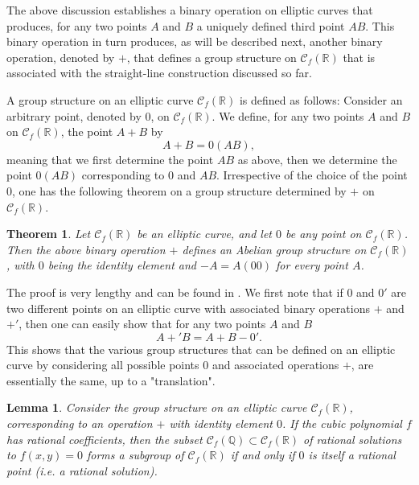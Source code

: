 \documentclass[12pt,letterpaper]{book}
\newtheorem{theorem}{Theorem}
\newtheorem{lemma}{Lemma}
\begin{document}
The above discussion establishes a binary operation on elliptic
curves that produces, for any two points $A$ and $B$ a uniquely
defined third point $AB$. This binary operation in turn produces, as
will be described next, another binary operation, denoted by $+$,
that defines a group structure on $\mathscr{C}_f(\mathbb{R})$ that
is associated with the straight-line construction discussed so far.

A group structure on an elliptic curve $\mathscr{C}_f(\mathbb{R})$ is defined as follows: Consider an arbitrary point,
denoted by $0$, on $\mathscr{C}_f(\mathbb{R})$. We define, for any two points $A$ and $B$ on $\mathscr{C}_f(\mathbb{R})$,
the point $A+B$ by
\begin{equation}
A+B=0(AB),
\end{equation}
meaning that we first determine the point $AB$ as above, then we determine the point $0(AB)$ corresponding to $0$ and $AB$. Irrespective of the choice of the
point $0$, one has the following theorem on a group structure determined by $+$ on $\mathscr{C}_f(\mathbb{R})$.

\begin{theorem}
Let $\mathscr{C}_f(\mathbb{R})$ be an elliptic curve, and let $0$ be any point on $\mathscr{C}_f(\mathbb{R})$.
Then the above binary operation $+$ defines an Abelian group structure on $\mathscr{C}_f(\mathbb{R})$, with $0$ being
the identity element and $-A=A(00)$ for every point $A$.
\end{theorem}

The proof is very lengthy and can be found in \cite{NMZ}. We first
note that if $0$ and $0'$ are two different points on an elliptic
curve with associated binary operations $+$ and $+'$, then one can
easily show that for any two points $A$ and $B$
\begin{equation}
A+'B=A+B-0'.
\end{equation}
This shows that the various group structures that can be defined on an elliptic curve by considering all possible
points $0$ and associated operations $+$, are essentially the same, up to a "translation".

\begin{lemma}
Consider the group structure on an elliptic curve
$\mathscr{C}_f(\mathbb{R})$, corresponding to an operation $+$ with
identity element $0$. If the cubic polynomial $f$ has rational
coefficients, then the subset
$\mathscr{C}_f(\mathbb{Q})\subset\mathscr{C}_f(\mathbb{R})$ of
rational solutions to $f(x,y)=0$ forms a subgroup of
$\mathscr{C}_f(\mathbb{R})$ if and only if $0$ is itself a rational
point (i.e. a rational solution).
\end{lemma}
\end{document}
